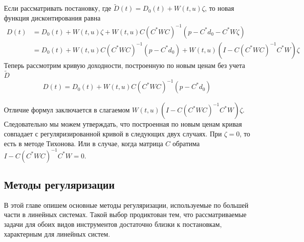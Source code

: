 \documentclass[10pt]{article}
\theoremstyle{definition}
\theoremstyle{remark}
\theoremstyle{plain}
\newcommand{\wt}{\widetilde}
\begin{document}
Если рассматривать постановку, где $\wt{D}(t) = D_0(t)+W(t,u)\zeta$, то новая функция дисконтирования равна
\begin{align*}
D(t) &= D_0(t) + W(t,u)\zeta+ W(t,u)C(C^*WC)^{-1}(p-C^*d_0-C^*W\zeta)
\\
&= D_0(t) + W(t,u)C(C^*WC)^{-1}(p-C^*d_0) + W(t,u)(I - C(C^*WC)^{-1}C^*W)\zeta
\end{align*}
Теперь рассмотрим  кривую доходности, построенную по новым ценам без учета $\wt{D}$
\begin{align*}
D(t) = D_0(t) + W(t,u)C(C^*WC)^{-1}(p-C^*d_0)
\end{align*}

Отличие формул заключается в слагаемом $W(t,u)(I - C(C^*WC)^{-1}C^*W)\zeta$. Следовательно мы можем утверждать, что построенная по новым ценам кривая совпадает с регуляризированной кривой в следующих  двух случаях. При $\zeta=0$, то есть в методе Тихонова. Или в случае, когда матрица $C$ обратима $I -C(C^*WC)^{-1}C^*W = 0$.





\subsection{Методы регуляризации}

В этой главе опишем основные методы регуляризации, используемые по большей части в линейных системах. Такой выбор продиктован тем, что рассматриваемые задачи для обоих видов инструментов достаточно близки к постановкам, характерным для линейных систем. 
\end{document}
